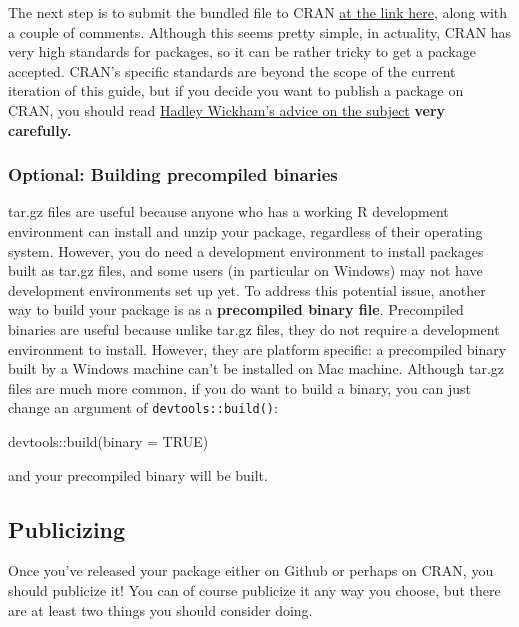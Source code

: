 \documentclass[
]{book}
\newenvironment{Shaded}{\begin{snugshade}}{\end{snugshade}}
\newcommand{\AttributeTok}[1]{\textcolor[rgb]{0.77,0.63,0.00}{#1}}
\newcommand{\ConstantTok}[1]{\textcolor[rgb]{0.00,0.00,0.00}{#1}}
\newcommand{\FunctionTok}[1]{\textcolor[rgb]{0.00,0.00,0.00}{#1}}
\newcommand{\NormalTok}[1]{#1}
\newcommand{\SpecialCharTok}[1]{\textcolor[rgb]{0.00,0.00,0.00}{#1}}
\begin{document}
The next step is to submit the bundled file to CRAN \href{https://cran.r-project.org/submit.html}{at the link here}, along with a couple of comments. Although this seems pretty simple, in actuality, CRAN has very high standards for packages, so it can be rather tricky to get a package accepted. CRAN's specific standards are beyond the scope of the current iteration of this guide, but if you decide you want to publish a package on CRAN, you should read \href{http://r-pkgs.had.co.nz/release.html}{Hadley Wickham's advice on the subject} \textbf{very carefully.}

\hypertarget{optional-building-precompiled-binaries}{%
\subsubsection{Optional: Building precompiled binaries}\label{optional-building-precompiled-binaries}}

tar.gz files are useful because anyone who has a working R development environment can install and unzip your package, regardless of their operating system. However, you do need a development environment to install packages built as tar.gz files, and some users (in particular on Windows) may not have development environments set up yet. To address this potential issue, another way to build your package is as a \textbf{precompiled binary file}. Precompiled binaries are useful because unlike tar.gz files, they do not require a development environment to install. However, they are platform specific: a precompiled binary built by a Windows machine can't be installed on Mac machine. Although tar.gz files are much more common, if you do want to build a binary, you can just change an argument of \texttt{devtools::build()}:

\begin{Shaded}
\begin{Highlighting}[]
\NormalTok{devtools}\SpecialCharTok{::}\FunctionTok{build}\NormalTok{(}\AttributeTok{binary =} \ConstantTok{TRUE}\NormalTok{)}
\end{Highlighting}
\end{Shaded}

and your precompiled binary will be built.

\hypertarget{publicizing}{%
\subsection{Publicizing}\label{publicizing}}

Once you've released your package either on Github or perhaps on CRAN, you should publicize it! You can of course publicize it any way you choose, but there are at least two things you should consider doing.
\end{document}
